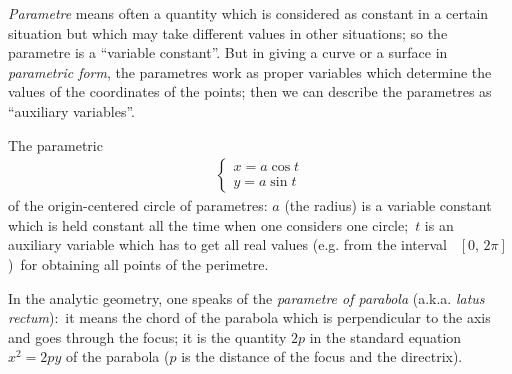 \documentclass[12pt]{article}
\theoremstyle{definition}
\begin{document}
\emph{Parametre} means often a quantity which is considered as constant in a certain situation but which may take different values in other situations; so the parametre is a ``variable constant''.\; But in giving a curve or a surface in {\em parametric form}, the parametres work as proper variables which determine the values of the coordinates of the points; then we can describe the parametres as ``auxiliary variables''.

The parametric 
\begin{align*}
\begin{cases}
  x = a\cos{t}\\
  y = a\sin{t}
\end{cases}
\end{align*}
of the origin-centered circle  of parametres:\; $a$ (the radius) is a variable constant which is held constant all the time when one considers one circle;\, $t$ is an auxiliary variable which has to get all real values (e.g. from the interval \, $[0,\,2\pi]$)\, for obtaining all points of the perimetre.

In the analytic geometry, one speaks of the \emph{parametre of parabola} (a.k.a. \emph{latus rectum}):\, it means the chord of the parabola which is perpendicular to the axis and goes through the focus; it is the quantity $2p$ in the standard equation \, $x^2 = 2py$\; of the parabola ($p$ is the distance of the focus and the directrix).
\end{document}
